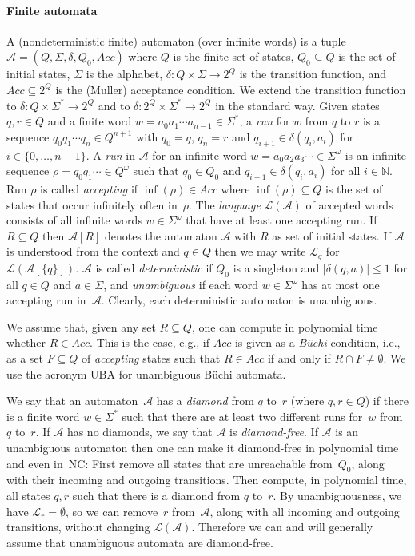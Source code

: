 \documentclass{elsarticle}
\def\Nat{\mathbb{N}}
\def\cA{\mathcal{A}}
\def\cL{\mathcal{L}}
\def\Acc{\mathit{Acc}}
\begin{document}
\paragraph*{Finite automata}
A (nondeterministic finite) automaton (over infinite words)
is a tuple $\cA = (Q,\Sigma,\delta,Q_0,\Acc)$
where $Q$ is the finite set of states, $Q_0 \subseteq Q$ is the set of initial
states, $\Sigma$ is the alphabet,
$\delta: Q \times \Sigma \to 2^Q$ is
the transition function, and $\Acc \subseteq 2^Q$ is the (Muller) acceptance condition.
We extend the transition function to $\delta: Q \times \Sigma^* \to 2^Q$
and to $\delta: 2^Q \times \Sigma^* \to 2^Q$ in the standard way.
Given states $q,r\in Q$ and a finite word
$w = a_0 a_1 \cdots a_{n-1} \in \Sigma^*$,
a \emph{run} for $w$ from $q$ to $r$ is a sequence
$q_0 q_1 \cdots q_n \in Q^{n+1}$ with $q_0=q$, $q_n=r$ and
$q_{i+1} \in \delta(q_i,a_i)$ for $i \in \{0, \ldots, n-1\}$.
A \emph{run} in $\cA$ for an infinite word
$w = a_0 a_2 a_3 \cdots \in \Sigma^{\omega}$ is an infinite sequence
$\rho = q_0 q_1 \cdots \in Q^{\omega}$ such that $q_0 \in Q_0$ and
$q_{i+1} \in \delta(q_i,a_i)$ for all $i \in \Nat$.  Run $\rho$ is
called \emph{accepting} if $\inf(\rho) \in \Acc$ where
$\inf(\rho) \subseteq Q$ is the set of states that occur infinitely
often in~$\rho$.  The \emph{language} $\cL(\cA)$ of accepted words
consists of all infinite words $w\in \Sigma^{\omega}$ that have at
least one accepting run.
If $R \subseteq Q$ then $\cA[R]$ denotes the automaton $\cA$ with $R$
as set of initial states.  If $\cA$ is understood from the context and
$q \in Q$ then we may write $\cL_q$ for~$\cL(\cA[\{q\}])$.
$\cA$ is called  \emph{deterministic} if $Q_0$ is a singleton and  $|\delta(q,a)| \leqslant 1$  for all $q \in Q$ and $a \in \Sigma$, and \emph{unambiguous} if each word $w\in \Sigma^{\omega}$ has at most one accepting run in~$\cA$.
Clearly, each deterministic automaton is unambiguous.

We assume that, given any set $R \subseteq Q$, one can compute in
polynomial time whether $R \in \Acc$.  This is the case, e.g., if
$\Acc$ is given as a \emph{B\"uchi} condition, i.e., as a set
$F \subseteq Q$ of \emph{accepting} states such that $R \in \Acc$ if
and only if $R \cap F \ne \emptyset$.
We use the acronym UBA for unambiguous B\"uchi automata.

We say that an automaton~$\cA$ has a \emph{diamond} from $q$ to~$r$
(where $q,r \in Q$) if there is a finite word $w \in \Sigma^*$ such
that there are at least two different runs for~$w$ from $q$ to~$r$.
If $\cA$ has no diamonds, we say that $\cA$ is \emph{diamond-free}.
If $\cA$ is an unambiguous automaton then one can make it diamond-free
in polynomial time and even in~NC: First remove all states that are unreachable
from~$Q_0$, along with their incoming and outgoing transitions.  Then
compute, in polynomial time, all states $q, r$ such that there is a
diamond from $q$ to~$r$.  By unambiguousness, we have
$\cL_r = \emptyset$, so we can remove~$r$ from~$\cA$, along with all
incoming and outgoing transitions, without changing $\cL(\cA)$.
Therefore we can and will generally assume that unambiguous automata are diamond-free.
\end{document}
